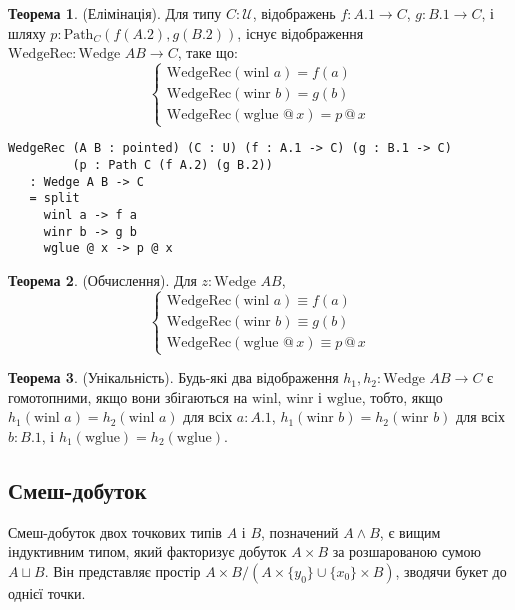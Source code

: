 \documentclass{article}
\theoremstyle{definition}
\newtheorem{theorem}{Теорема}
\begin{document}
\begin{theorem} (Елімінація).
Для типу \( C : \mathcal{U} \), відображень \( f : A.1 \to C \), \( g : B.1 \to C \), і шляху \( p : \text{Path}_C (f (A.2), g (B.2)) \), існує відображення \( \text{WedgeRec} : \text{Wedge } A B \to C \), таке що:
\[
\begin{cases}
\text{WedgeRec}(\text{winl } a) = f(a) \\
\text{WedgeRec}(\text{winr } b) = g(b) \\
\text{WedgeRec}(\text{wglue } @ \, x) = p \, @ \, x
\end{cases}
\]
\begin{lstlisting}
WedgeRec (A B : pointed) (C : U) (f : A.1 -> C) (g : B.1 -> C)
         (p : Path C (f A.2) (g B.2))
   : Wedge A B -> C
   = split
     winl a -> f a
     winr b -> g b
     wglue @ x -> p @ x
\end{lstlisting}
\end{theorem}

\begin{theorem} (Обчислення).
Для \( z : \text{Wedge } A B \),
\[
\begin{cases}
\text{WedgeRec}(\text{winl } a) \equiv f(a) \\
\text{WedgeRec}(\text{winr } b) \equiv g(b) \\
\text{WedgeRec}(\text{wglue } @ \, x) \equiv p \, @ \, x
\end{cases}
\]
\end{theorem}

\begin{theorem} (Унікальність).
Будь-які два відображення \( h_1, h_2 : \text{Wedge } A B \to C \) є гомотопними, якщо
вони збігаються на \( \text{winl} \), \( \text{winr} \) і \( \text{wglue} \),
тобто, якщо \( h_1(\text{winl } a) = h_2(\text{winl } a) \) для
всіх \( a : A.1 \), \( h_1(\text{winr } b) = h_2(\text{winr } b) \) для
всіх \( b : B.1 \), і \( h_1(\text{wglue}) = h_2(\text{wglue}) \).
\end{theorem}

\newpage
\subsection{Смеш-добуток}
Смеш-добуток двох точкових типів \( A \) і \( B \), позначений \( A \wedge B \),
є вищим індуктивним типом, який факторизує добуток \( A \times B \) за
розшарованою сумою \( A \sqcup B \). Він представляє простір \( A \times B / (A \times \{ y_0 \} \cup \{ x_0 \} \times B) \),
зводячи букет до однієї точки.
\end{document}
